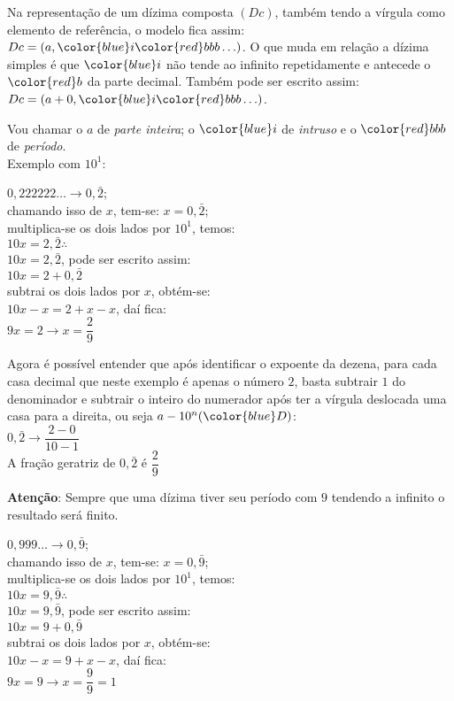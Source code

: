 Na representação de um dízima composta $ (Dc) $, também tendo a vírgula como elemento de referência, o modelo fica assim: $ Dc = (a,\color{blue}i\color{red}bbb \hdots) $. O que muda em relação a dízima simples é que $ \color{blue}i $ não tende ao infinito repetidamente e antecede o $ \color{red}b $ da parte decimal. Também pode ser escrito assim: $ Dc = (a + 0,\color{blue}i\color{red}bbb \hdots) $. \\

\newpage

Vou chamar o $ a $ de \textit{parte inteira}; o $ \color{blue}i $ de \textit{intruso} e o $ \color{red}bbb $ de \textit{período}. \\

Exemplo com $ 10^1 $:
\begin{multicols}{2}
		\setlength{\columnseprule}{.5pt}
	$ 0,222222 \hdots  \longrightarrow 0,\bar{2} $; \\
	chamando isso de $ x $, tem-se: $ x = 0,\bar{2} $; \\
	multiplica-se os dois lados por $ 10^1 $, temos: \\
	$ 10x = 2,\bar{2} \therefore $ \\
	$ 10x = 2,\bar{2} $, pode ser escrito assim: \\ $ 10x = 2 + 0,\bar{2} $\\
	subtrai os dois lados por $ x $, obtém-se: \\ $ 10x - x = 2 + x - x $, daí fica: \\	
	$ 9x = 2 \longrightarrow x = \dfrac{2}{9} $
	
	\columnbreak
	Agora é possível entender que após identificar o expoente da dezena, para cada casa decimal que neste exemplo é apenas o número $ 2 $, basta subtrair $ 1 $ do denominador e subtrair o inteiro do numerador após ter a vírgula deslocada uma casa para a direita, ou seja $ a - 10^n({\color{blue}D}) $:\\
	
	$ 0,\bar{2} \longrightarrow \dfrac{2 - 0}{10-1} $\\
	 A fração geratriz de $ 0,\bar{2} $ é $ \dfrac{2}{9} $
	
\end{multicols}

\textbf{Atenção}: Sempre que uma dízima tiver seu período com $ 9 $ tendendo a infinito o resultado será finito.

$ 0,999 \hdots \longrightarrow 0,\bar{9} $; \\
	chamando isso de $ x $, tem-se: $ x = 0,\bar{9} $; \\
	multiplica-se os dois lados por $ 10^1 $, temos: \\
	$ 10x = 9,\bar{9} \therefore $ \\
	$ 10x = 9,\bar{9} $, pode ser escrito assim: \\ $ 10x = 9 + 0,\bar{9} $\\
	subtrai os dois lados por $ x $, obtém-se: \\ $ 10x - x = 9 + x - x $, daí fica: \\
	$ 9x = 9 \longrightarrow x = \dfrac{9}{9} = 1 $ \\
	
